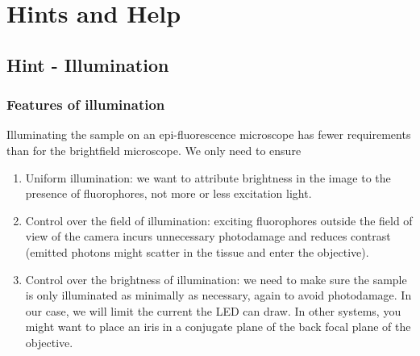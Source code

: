 \documentclass[a4paper]{report}
\begin{document}
\section{Hints and Help}
   \subsection{Hint - Illumination}
\hypertarget{hintTo-illumination}{}
\subsubsection{Features of illumination}
Illuminating the sample on an epi-fluorescence microscope has fewer requirements than for the brightfield microscope. We only need to ensure
\begin{enumerate}
    \item Uniform illumination: we want to attribute brightness in the image to the presence of fluorophores, not more or less excitation light.
    \item Control over the field of illumination: exciting fluorophores outside the field of view of the camera incurs unnecessary photodamage and reduces contrast (emitted photons might scatter in the tissue and enter the objective).
    \item Control over the brightness of illumination: we need to make sure the sample is only illuminated as minimally as necessary, again to avoid photodamage. In our case, we will limit the current the LED can draw. In other systems, you might want to place an iris in a conjugate plane of the back focal plane of the objective.
\end{enumerate}
\end{document}
